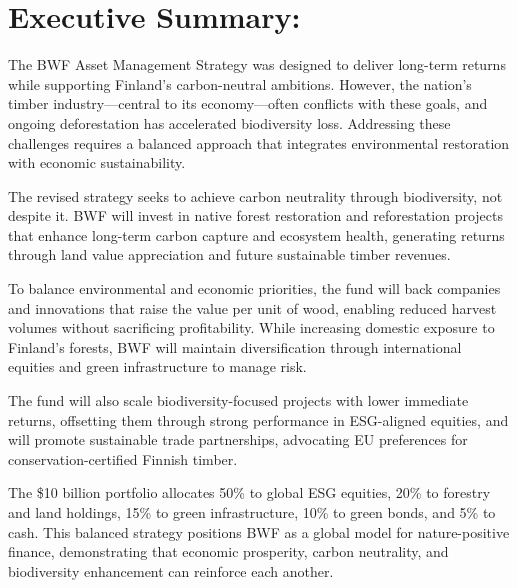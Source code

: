 

\section*{Executive Summary:}

\par The BWF Asset Management Strategy was designed to deliver long-term returns while supporting Finland’s carbon-neutral ambitions. However, the nation’s timber industry—central to its economy—often conflicts with these goals, and ongoing deforestation has accelerated biodiversity loss. Addressing these challenges requires a balanced approach that integrates environmental restoration with economic sustainability.
\par The revised strategy seeks to achieve carbon neutrality through biodiversity, not despite it. BWF will invest in native forest restoration and reforestation projects that enhance long-term carbon capture and ecosystem health, generating returns through land value appreciation and future sustainable timber revenues.
\par To balance environmental and economic priorities, the fund will back companies and innovations that raise the value per unit of wood, enabling reduced harvest volumes without sacrificing profitability. While increasing domestic exposure to Finland’s forests, BWF will maintain diversification through international equities and green infrastructure to manage risk.
\par The fund will also scale biodiversity-focused projects with lower immediate returns, offsetting them through strong performance in ESG-aligned equities, and will promote sustainable trade partnerships, advocating EU preferences for conservation-certified Finnish timber.
\par The \$10 billion portfolio allocates 50\% to global ESG equities, 20\% to forestry and land holdings, 15\% to green infrastructure, 10\% to green bonds, and 5\% to cash.
This balanced strategy positions BWF as a global model for nature-positive finance, demonstrating that economic prosperity, carbon neutrality, and biodiversity enhancement can reinforce each another.
